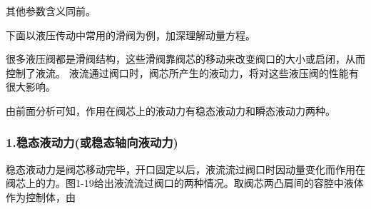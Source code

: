 其他参数含义同前。

下面以液压传动中常用的滑阀为例，加深理解动量方程。

很多液压阀都是滑阀结构，这些滑阀靠阀芯的移动来改变阀口的大小或启闭，从而控制了液流。
液流通过阀口时，阀芯所产生的液动力，将对这些液压阀的性能有很大影响。

由前面分析可知，作用在阀芯上的液动力有稳态液动力和瞬态液动力两种。

\subsubsection*{1.稳态液动力(或稳态轴向液动力)}

稳态液动力是阀芯移动完毕，开口固定以后，液流流过阀口时因动量变化而作用在阀芯上的力。图1-19给出液流流过阀口的两种情况。取阀芯两凸肩间的容腔中液体作为控制体，由